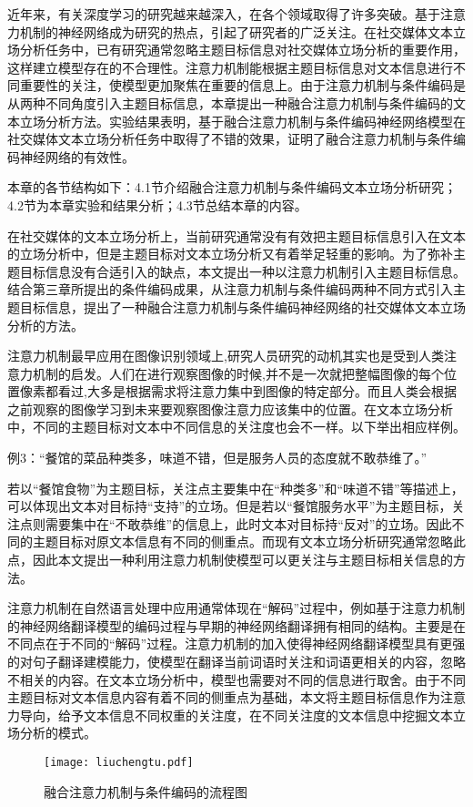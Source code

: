 

近年来，有关深度学习的研究越来越深入，在各个领域取得了许多突破。基于注意力机制的神经网络成为研究的热点，引起了研究者的广泛关注。在社交媒体文本立场分析任务中，已有研究通常忽略主题目标信息对社交媒体立场分析的重要作用，这样建立模型存在的不合理性。注意力机制能根据主题目标信息对文本信息进行不同重要性的关注，使模型更加聚焦在重要的信息上。由于注意力机制与条件编码是从两种不同角度引入主题目标信息，本章提出一种融合注意力机制与条件编码的文本立场分析方法。实验结果表明，基于融合注意力机制与条件编码神经网络模型在社交媒体文本立场分析任务中取得了不错的效果，证明了融合注意力机制与条件编码神经网络的有效性。

本章的各节结构如下：4.1节介绍融合注意力机制与条件编码文本立场分析研究；4.2节为本章实验和结果分析；4.3节总结本章的内容。


在社交媒体的文本立场分析上，当前研究通常没有有效把主题目标信息引入在文本的立场分析中，但是主题目标对文本立场分析又有着举足轻重的影响。为了弥补主题目标信息没有合适引入的缺点，本文提出一种以注意力机制引入主题目标信息。结合第三章所提出的条件编码成果，从注意力机制与条件编码两种不同方式引入主题目标信息，提出了一种融合注意力机制与条件编码神经网络的社交媒体文本立场分析的方法。

注意力机制最早应用在图像识别领域上,研究人员研究的动机其实也是受到人类注意力机制的启发。人们在进行观察图像的时候,并不是一次就把整幅图像的每个位置像素都看过,大多是根据需求将注意力集中到图像的特定部分。而且人类会根据之前观察的图像学习到未来要观察图像注意力应该集中的位置。在文本立场分析中，不同的主题目标对文本中不同信息的关注度也会不一样。以下举出相应样例。

例3：“餐馆的菜品种类多，味道不错，但是服务人员的态度就不敢恭维了。”

若以“餐馆食物”为主题目标，关注点主要集中在“种类多”和“味道不错”等描述上，可以体现出文本对目标持“支持”的立场。但是若以“餐馆服务水平”为主题目标，关注点则需要集中在“不敢恭维”的信息上，此时文本对目标持“反对”的立场。因此不同的主题目标对原文本信息有不同的侧重点。而现有文本立场分析研究通常忽略此点，因此本文提出一种利用注意力机制使模型可以更关注与主题目标相关信息的方法。

注意力机制在自然语言处理中应用通常体现在“解码”过程中，例如基于注意力机制的神经网络翻译模型的编码过程与早期的神经网络翻译拥有相同的结构。主要是在不同点在于不同的“解码”过程。注意力机制的加入使得神经网络翻译模型具有更强的对句子翻译建模能力，使模型在翻译当前词语时关注和词语更相关的内容，忽略不相关的内容。在文本立场分析中，模型也需要对不同的信息进行取舍。由于不同主题目标对文本信息内容有着不同的侧重点为基础，本文将主题目标信息作为注意力导向，给予文本信息不同权重的关注度，在不同关注度的文本信息中挖掘文本立场分析的模式。
\begin{figure}[htbp]
	\centering
	\texttt{[image: liuchengtu.pdf]}
	\caption[rnn_vanish]{融合注意力机制与条件编码的流程图}
	\label{liuchengtu}
\end{figure}

